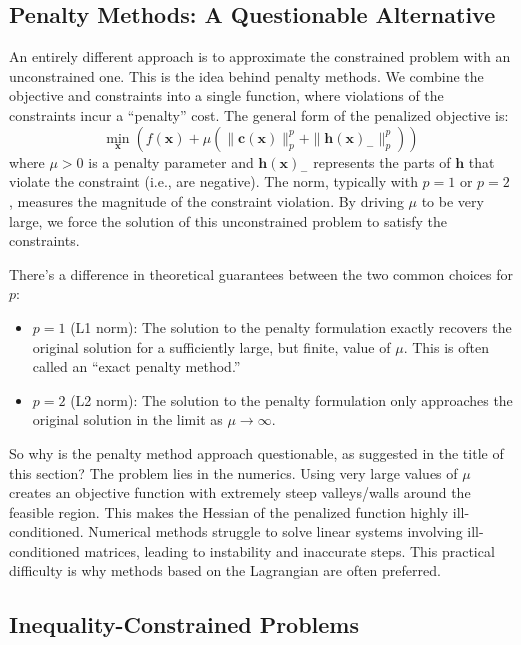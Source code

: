 \subsection{Penalty Methods: A Questionable Alternative}

An entirely different approach is to approximate the constrained problem with an unconstrained one. This is the idea behind penalty methods. We combine the objective and constraints into a single function, where violations of the constraints incur a ``penalty'' cost. The general form of the penalized objective is:
\begin{equation}
\min_{\mathbf{x}} \left( f(\mathbf{x}) + \mu \left( \| \mathbf{c}(\mathbf{x}) \|_p^p + \| \mathbf{h}(\mathbf{x})_{-} \|_p^p \right) \right)
\end{equation}
where $\mu > 0$ is a penalty parameter and $\mathbf{h}(\mathbf{x})_{-}$ represents the parts of $\mathbf{h}$ that violate the constraint (i.e., are negative). The norm, typically with $p=1$ or $p=2$, measures the magnitude of the constraint violation. By driving $\mu$ to be very large, we force the solution of this unconstrained problem to satisfy the constraints.

There's a difference in theoretical guarantees between the two common choices for $p$:
\begin{itemize}
    \item $p = 1$ (L1 norm): The solution to the penalty formulation exactly recovers the original solution for a sufficiently large, but finite, value of $\mu$. This is often called an ``exact penalty method.''
    \item $p = 2$ (L2 norm): The solution to the penalty formulation only approaches the original solution in the limit as $\mu \to \infty$.
\end{itemize}

So why is the penalty method approach questionable, as suggested in the title of this section? The problem lies in the numerics. Using very large values of $\mu$ creates an objective function with extremely steep valleys/walls around the feasible region. This makes the Hessian of the penalized function highly ill-conditioned. Numerical methods struggle to solve linear systems involving ill-conditioned matrices, leading to instability and inaccurate steps. This practical difficulty is why methods based on the Lagrangian are often preferred.

\subsection{Inequality-Constrained Problems}

